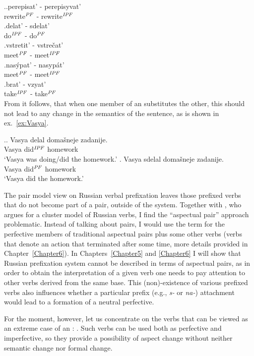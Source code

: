 \ex.\ag.\label{pair1}perepisat' - perepisyvat'\\
rewrite$^{\mathit{PF}}$ - rewrite$^{\mathit{IPF}}$\\
\bg.\label{pair2}delat' - sdelat'\\
do$^{\mathit{IPF}}$ - do$^{\mathit{PF}}$\\
\bg.\label{pair3}vstretit' - vstre\v{c}at'\\
meet$^{\mathit{PF}}$ - meet$^{\mathit{IPF}}$\\
\bg.\label{pair4}nas\'ypat' - nasyp\'at'\\
meet$^{\mathit{PF}}$ - meet$^{\mathit{IPF}}$\\
\bg.\label{pair5}brat' - vzyat'\\
take$^{\mathit{IPF}}$ - take$^{\mathit{PF}}$\\

From  it follows, that when one member of an  substitutes the other, this should not lead to any change in the semantics of the sentence, as is shown in ex.~\ref{ex:Vasya}.

\ex.\label{ex:Vasya}\ag. Vasya delal {doma\v{s}neje zadanije}.\\
Vasya did$^{\mathit{IPF}}$ homework\\
`Vasya was doing/did the homework.'
\bg. Vasya sdelal {doma\v{s}neje zadanije}.\\
Vasya did$^{\mathit{PF}}$ homework\\
`Vasya did the homework.'

The pair model view on Russian verbal prefixation leaves those prefixed verbs that do not become part of a pair, outside of the system. Together with \citet{Janda:07a}, who argues for a cluster model of Russian verbs, I find the ``aspectual pair'' approach problematic. Instead of talking about pairs, I would use the term \textit{} for the perfective members of traditional aspectual pairs plus some other verbs (verbs that denote an action that terminated after some time, more details provided in Chapter~\ref{Chapter6}). In Chapters~\ref{Chapter5} and \ref{Chapter6} I will show that Russian prefixation system cannot be described in terms of aspectual pairs, as in order to obtain the interpretation of a given verb one needs to pay attention to other verbs derived from the same base. This (non)-existence of various prefixed verbs also influences whether a particular prefix (e.g., \textit{s-} or \textit{na-}) attachment would lead to a formation of a neutral perfective.

For the moment, however, let us concentrate on the verbs that can be viewed as an extreme case of an : . Such verbs can be used both as perfective and imperfective, so they provide a possibility of aspect change without neither semantic change nor formal change.

